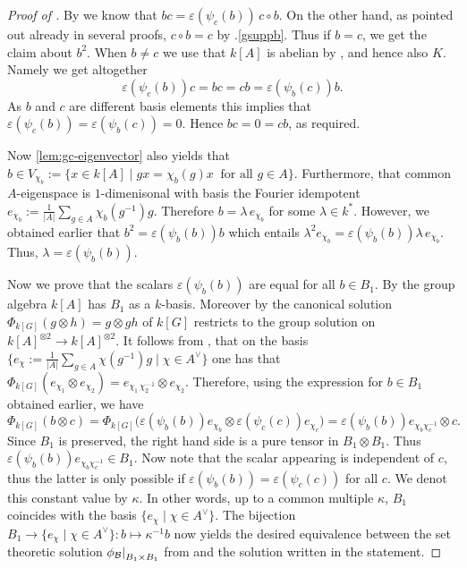 \documentclass[a4paper,10pt]{amsart}
\theoremstyle{definition}
\theoremstyle{remark}
\newcommand\eps{\varepsilon}
\newcommand\ot{\otimes}
\newcommand\mc{\mathcal}
\newcommand\restr[2]{{%
   \left.\kern-\nulldelimiterspace %
   #1 %
   \right|_{#2} %
   }}
\begin{document}
\begin{proof}[Proof of ]
 By  we know that $bc = \eps(\psi_{c}(b)) \, c \circ b.$ On the other hand, as pointed out already in several proofs, $c \circ b = c$ by .\eqref{gsuppb}. Thus if $b=c$, we get the claim about $b^2$. When $b \neq c$ we use that $k[A]$ is abelian by , and hence also $K$. Namely we get altogether
$$\eps(\psi_{c}(b)) c = bc = cb = \eps(\psi_{b}(c)) b.$$
As $b$ and $c$ are different basis elements this implies that $\eps(\psi_{c}(b)) = \eps(\psi_{b}(c)) = 0.$ Hence $bc = 0 = cb$, as required.

Now  \cref{lem:gc-eigenvector} also yields that $b \in V_{\chi_b}:=\{x\in k[A]\mid gx=\chi_b(g)x\ \text{ for all } g\in A\}.$ Furthermore, that common $A$-eigenspace is $1$-dimenisonal with basis the Fourier idempotent $e_{\chi_b}:= \frac{1}{|A|} \sum_{g \in A}\chi_b(g^{-1})g.$ Therefore $b = \lambda \, e_{\chi_b}$ for some $\lambda \in k^*$. However, we obtained earlier that $b^2 = \eps(\psi_b(b)) b$ which entails $\lambda^2 e_{\chi_b} = \eps(\psi_b(b)) \lambda\, e_{\chi_b}.$ Thus, $\lambda = \eps(\psi_b(b))$.

Now we prove that the scalars $\eps(\psi_b(b))$ are equal for all $b \in B_1.$ By  the group algebra $k[A]$ has $B_1$ as a $k$-basis. Moreover by  the canonical solution $\Phi_{k[G]}( g\ot h) = g \ot gh$ of $k[G]$ restricts to the group solution on $k[A]^{\ot 2} \rightarrow k[A]^{\ot 2}.$ It follows from , that on the basis $\{ e_{\chi} :=  \frac{1}{|A|} \sum_{g \in A}\chi(g^{-1})g \mid \chi \in A^{\vee}\}$ one has that $\Phi_{k[G]}(e_{\chi_1} \ot e_{\chi_2})= e_{\chi_1 \, \chi^{—1}_2} \ot e_{\chi_2}$. Therefore, using the expression for $b \in B_1$ obtained earlier, we have 
$$\Phi_{k[G]}(b \ot c) =\Phi_{k[G]} \big( \eps(\psi_b(b)) e_{\chi_b} \ot  \eps(\psi_c(c)) e_{\chi_c}\big) =  \eps(\psi_b(b)) e_{\chi_b\chi_c^{-1}} \ot c.$$
Since $B_1$ is preserved, the right hand side is a pure tensor in $B_1 \ot B_1$. Thus $ \eps(\psi_b(b)) e_{\chi_b\chi_c^{-1}} \in B_1$. Now note that the scalar appearing is independent of $c$, thus the latter is only possible if $\eps(\psi_b(b)) = \eps(\psi_c(c))$ for all $c.$ We denot this constant value by $\kappa$. In other words, up to a common multiple $\kappa$, $B_1$ coincides with the basis $\{ e_{\chi} \mid  \chi \in A^{\vee} \}.$ The bijection $B_1 \rightarrow\{ e_{\chi} \mid  \chi \in A^{\vee} \}: b \mapsto \kappa^{-1} b$ now yields the desired equivalence between the set theoretic solution $\restr{\phi_{\mc{B}}}{B_1 \times B_1}$ from  and the solution written in the statement.
 \end{proof}
\end{document}
